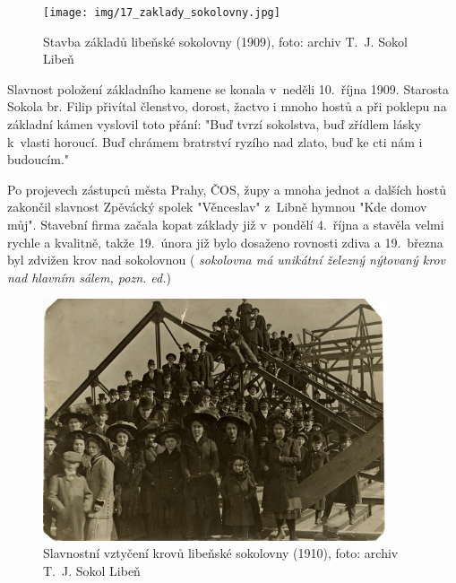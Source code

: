 \documentclass[a5paper, 11pt, twoside]{article}
\newcommand{\pozned}[1]{%
\textit{#1}}
\begin{document}
\begin{figure}[h!]
  \centering 
  \texttt{[image: img/17\_zaklady\_sokolovny.jpg]}
  \caption*{Stavba základů libeňské sokolovny (1909), foto: archiv T.~J. Sokol
  Libeň}
\end{figure}

Slavnost položení základního kamene se konala v~neděli 10.~října 1909.
Starosta Sokola br. Filip přivítal členstvo, dorost, žactvo i mnoho
hostů a při poklepu na základní kámen vyslovil toto přání: "Buď tvrzí
sokolstva, buď zřídlem lásky k~vlasti horoucí. Buď chrámem bratrství
ryzího nad zlato, buď ke cti nám i budoucím."

Po projevech zástupců města Prahy, ČOS, župy a mnoha jednot a dalších
hostů zakončil slavnost Zpěvácký spolek "Věnceslav" z~Libně hymnou "Kde
domov můj". Stavební firma začala kopat základy již v~pondělí 4.~října
a stavěla velmi rychle a kvalitně, takže 19.~února již bylo dosaženo
rovnosti zdiva a 19.~března byl zdvižen krov nad sokolovnou
(\pozned{sokolovna má unikátní železný nýtovaný krov nad hlavním sálem,
pozn. ed.})

\begin{figure}[h!]
  \centering 
  \includegraphics[width=0.9\textwidth]{img/18_krovy_sokolovny.jpg}
  \caption*{Slavnostní vztyčení krovů libeňské sokolovny (1910), foto: archiv T.~J. Sokol Libeň}
\end{figure}
\end{document}
